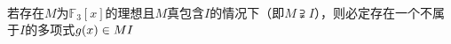 \begin{solution}\ \\
    若存在$M$为$\mathbb{F}_3[x]$的理想且$M$真包含$I$的情况下（即$M\supsetneqq I$），则必定存在一个不属于$I$的多项式$g(x)\in M\\I$
\end{solution}
